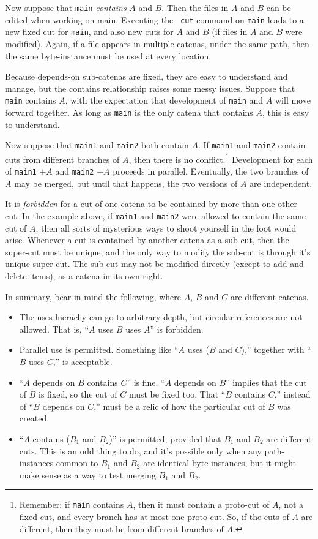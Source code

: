 \documentclass[10pt]{article}
\begin{document}
Now suppose that {\tt main} {\it contains} $A$ and $B$. Then the files
in $A$ and $B$ can be edited when working on main. Executing the {\tt
  cut} command on {\tt main} leads to a new fixed cut for {\tt main},
and also new cuts for $A$ and $B$ (if files in $A$ and $B$ were 
modified). Again, if a file appears in multiple catenas, 
under the same path, then the same byte-instance must be used at every location.

Because depends-on sub-catenas are fixed, they are easy to understand
and manage, but the contains relationship raises some messy
issues. Suppose that {\tt main} contains $A$, with the expectation that
development of {\tt main} and $A$ will move forward together. As long
as {\tt main} is the only catena that contains $A$, this is easy to understand.

Now suppose that {\tt main1} and {\tt main2} both contain $A$. If 
{\tt main1} and {\tt main2} contain cuts from different branches of $A$,
then there is no conflict.\footnote{Remember: if {\tt main} contains
$A$, then it must contain a proto-cut of $A$, not a fixed cut, and
every branch has at most one proto-cut. So, if the cuts of $A$ are
different, then they must be from different branches of $A$.}
Development for each of {\tt main1} $+A$ and {\tt main2} $+A$ proceeds
in parallel. Eventually, the two branches of $A$ may be merged, but
until that happens, the two versions of $A$ are independent.

It is {\it forbidden} for a cut of one catena to be contained by more
than one other cut. In the example above, if {\tt main1} and {\tt main2}
were allowed to contain the same cut of $A$, then all sorts of
mysterious ways to shoot yourself in the foot would arise. Whenever a
cut is contained by another catena as a sub-cut, then the super-cut
must be unique, and the only way to modify the sub-cut is through it's 
unique super-cut. The sub-cut may not be modified directly (except to
add and delete items), as a catena in its own right. 

In summary, bear in mind the following, where $A$, $B$ and $C$ are
different catenas.
\begin{itemize}
\item The uses hierachy can go to arbitrary depth, but circular
  references are not allowed. That is, ``$A$ uses $B$ uses $A$'' is
  forbidden. 
\item Parallel use is permitted. Something like ``$A$ uses ($B$ and $C$),''
  together with ``$B$ uses $C$,'' is acceptable.
\item ``$A$ depends on $B$ contains $C$'' is fine. ``$A$ depends on $B$''
  implies that the cut of $B$ is fixed, so the cut of $C$ must be
  fixed too. That ``$B$ contains $C$,'' instead of ``$B$ depends on $C$,''
  must be a relic of how the particular cut of $B$ was created.
\item ``$A$ contains ($B_1$ and $B_2$)'' is permitted, provided that $B_1$
  and $B_2$ are different cuts. This is an odd thing to do, and it's
  possible only when any path-instances common to $B_1$ and $B_2$ are
  identical byte-instances, but it might make sense as a way to test
  merging $B_1$ and $B_2$. 
\end{itemize}
\end{document}
